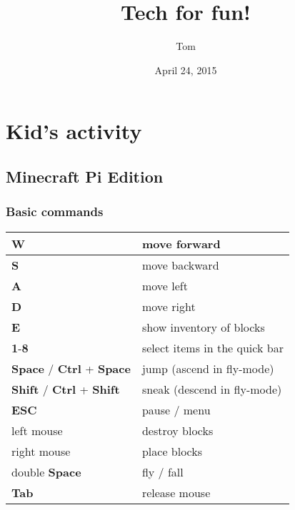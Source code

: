 \documentclass[letterpaper,10pt,english]{sphinxmanual}
\title{Tech for fun!}
\date{April 24, 2015}
\author{Tom}
\begin{document}
\maketitle
\tableofcontents
{}\label{index::doc}



\chapter{Kid's activity}
\label{index:kid-s-activity}\label{index:tech-for-fun}

\section{Minecraft Pi Edition}
\label{kid/minecraft::doc}\label{kid/minecraft:minecraft-pi-edition}

\subsection{Basic commands}
\label{kid/minecraft:basic-commands}
\begin{tabulary}{\linewidth}{|L|L|}
\hline

\textbf{W}
 & 
move forward
\\
\hline
\textbf{S}
 & 
move backward
\\
\hline
\textbf{A}
 & 
move left
\\
\hline
\textbf{D}
 & 
move right
\\
\hline
\textbf{E}
 & 
show inventory of blocks
\\
\hline
\textbf{1}-\textbf{8}
 & 
select items in the quick bar
\\
\hline
\textbf{Space} / \textbf{Ctrl} + \textbf{Space}
 & 
jump (ascend in fly-mode)
\\
\hline
\textbf{Shift} / \textbf{Ctrl} + \textbf{Shift}
 & 
sneak (descend in fly-mode)
\\
\hline
\textbf{ESC}
 & 
pause / menu
\\
\hline
left mouse
 & 
destroy blocks
\\
\hline
right mouse
 & 
place blocks
\\
\hline
double \textbf{Space}
 & 
fly / fall
\\
\hline
\textbf{Tab}
 & 
release mouse
\\
\hline\end{tabulary}
\end{document}

